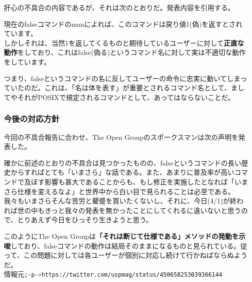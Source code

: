 肝心の不具合の内容であるが、それは次のとおりだ。発表内容を引用する。\\

\noindent
\begin{frameboxit}{160.0mm}
現在のfalseコマンドのmanによれば、このコマンドは戻り値1(偽)を返すとされています。\\

しかしそれは、当然1を返してくるものと期待しているユーザーに対して\textbf{正直な動作}をしており、これはfalse(偽る)というコマンド名に対して実は不適切な動作をしています。
\end{frameboxit}

つまり、falseというコマンドの名に反してユーザーの命令に忠実に動いてしまっていたのだ。これは、「名は体を表す」が重要とされるコマンド名として、ましてやそれがPOSIXで規定されるコマンドとして、あってはならないことだ。

\subsubsection*{今後の対応方針}

今回の不具合報告に合わせ、The Open Groupのスポークスマンは次の声明を発表した。\\

\noindent
\begin{frameboxit}{160.0mm}
確かに前述のとおりの不具合は見つかったものの、falseというコマンドの長い歴史からすればとても「いまさら」な話である。また、あまりに普及率が高いコマンドで及ぼす影響も甚大であることからも、もし修正を実施したとなれば「いまさら仕様を変えるなよ」と世界中から白い目で見られることは必至である。\\

 我々もいまさらそんな苦労と顰蹙を買いたくないし、それに、今日(4/1)が終われば世の中もきっと我々の発表を無かったことにしてくれるに違いないと思うので、とりあえず今日をひっそり生きようと思う。
\end{frameboxit}

このようにThe Open Groupは\textbf{「それは断じて仕様である」メソッドの発動を示唆}しており、falseコマンドの動作は結局そのままになるものと見られている。従って、この問題に対しては各ユーザーが個別に対応し続けて行かねばならぬようだ。\\

\noindent
情報元\verb|;-p|→\verb|https://twitter.com/uspmag/status/450658253039366144|
